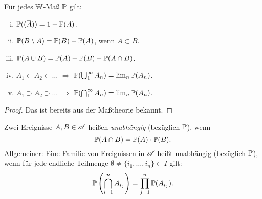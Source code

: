 \begin{thm}
  Für jedes $\mathbb{W}$-Maß $\mathbb{P}$ gilt:
  \begin{enumerate}[(i)]
  \item $\pP( (\obar{A}) ) = 1 - \pP(A)$.
  \item $\mathbb{P}( B \setminus A) = \mathbb{P}(B) - \mathbb{P}(A)$, wenn $A \subset B$.
  \item $\mathbb{P}(A \cup B) = \mathbb{P}(A) + \mathbb{P}(B) - \mathbb{P}(A \cap B)$.
  \item $A_1 \subset A_2 \subset \ldots$ $\Rightarrow$ $\mathbb{P}( \bigcup_1^\infty
    A_n) = \lim_n \mathbb{P}(A_n)$.
  \item $A_1 \supset A_2 \supset \ldots$ $\Rightarrow$ $\mathbb{P}( \bigcap_1^\infty
    A_n) = \lim_n \mathbb{P}(A_n)$.
  \end{enumerate}
\end{thm}

\begin{proof}
  Das ist bereits aus der Maßtheorie bekannt.
\end{proof}

\begin{defn}
  Zwei Ereignisse $A,B \in \mathscr{A}$ heißen \emph{unabhängig} (bezüglich $\mathbb{P}$), wenn
  \[ \mathbb{P}(A \cap B) = \mathbb{P}(A) \cdot \mathbb{P}(B). \]
  Allgemeiner: Eine Familie von Ereignissen in $\mathscr{A}$ heißt unabhängig (bezüglich
  $\mathbb{P}$), wenn für jede endliche Teilmenge $\emptyset \ne \{i_1, \ldots, i_n\}
  \subset I$ gilt:
  \[ \mathbb{P} \left( \bigcap_{i=1}^n A_{i_j} \right) = \prod_{j=1}^n \mathbb{P}( A_{i_j} ). \]
\end{defn}

